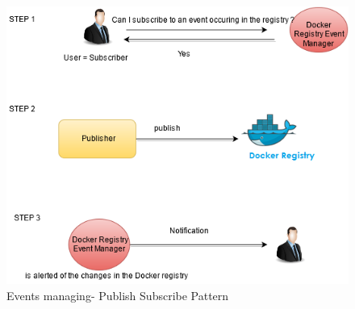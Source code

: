 \begin{figure}[H]
\centering
\includegraphics[scale=0.7]{5-patterns/images/RegistryPS.png}
\caption{Events managing- Publish Subscribe Pattern}
\label{fig:publish-subscribe}
\end{figure}

